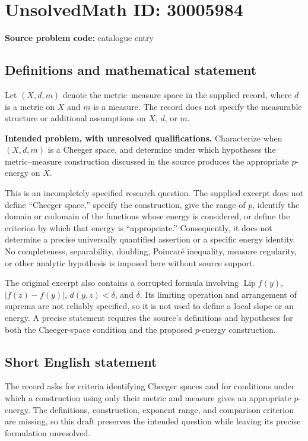 \documentclass[11pt]{article}
\begin{document}
\section*{UnsolvedMath ID: 30005984}
\textbf{Source problem code:} catalogue entry
\subsection{Definitions and mathematical statement}
Let \((X,d,m)\) denote the metric--measure space in the supplied record, where \(d\) is a metric on \(X\) and \(m\) is a measure. The record does not specify the measurable structure or additional assumptions on \(X\), \(d\), or \(m\).

\textbf{Intended problem, with unresolved qualifications.} Characterize when \((X,d,m)\) is a Cheeger space, and determine under which hypotheses the metric--measure construction discussed in the source produces the appropriate \(p\)-energy on \(X\).

This is an incompletely specified research question. The supplied excerpt does not define ``Cheeger space,'' specify the construction, give the range of \(p\), identify the domain or codomain of the functions whose energy is considered, or define the criterion by which that energy is ``appropriate.'' Consequently, it does not determine a precise universally quantified assertion or a specific energy identity. No completeness, separability, doubling, Poincar\'e inequality, measure regularity, or other analytic hypothesis is imposed here without source support.

The original excerpt also contains a corrupted formula involving \(\operatorname{Lip} f(y)\), \(|f(z)-f(y)|\), \(d(y,z)<\delta\), and \(\delta\). Its limiting operation and arrangement of suprema are not reliably specified, so it is not used to define a local slope or an energy. A precise statement requires the source's definitions and hypotheses for both the Cheeger-space condition and the proposed \(p\)-energy construction.
\subsection{Short English statement}
The record asks for criteria identifying Cheeger spaces and for conditions under which a construction using only their metric and measure gives an appropriate \(p\)-energy. The definitions, construction, exponent range, and comparison criterion are missing, so this draft preserves the intended question while leaving its precise formulation unresolved.
\end{document}
